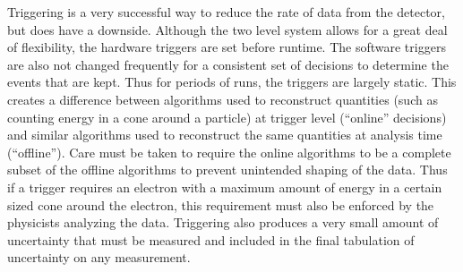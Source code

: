	
	Triggering is a very successful way to reduce the rate of data from the detector, but does have a downside. Although the two level system allows for a great deal of flexibility, the hardware triggers are set before runtime. The software triggers are also not changed frequently for a consistent set of decisions to determine the events that are kept. Thus for periods of runs, the triggers are largely static. This creates a difference between algorithms used to reconstruct quantities (such as counting energy in a cone around a particle) at trigger level (``online'' decisions) and similar algorithms used to reconstruct the same quantities at analysis time (``offline''). Care must be taken to require the online algorithms to be a complete subset of the offline algorithms to prevent unintended shaping of the data. Thus if a trigger requires an electron with a maximum amount of energy in a certain sized cone around the electron, this requirement must also be enforced by the physicists analyzing the data. Triggering also produces a very small amount of uncertainty that must be measured and included in the final tabulation of uncertainty on any measurement.\\
	